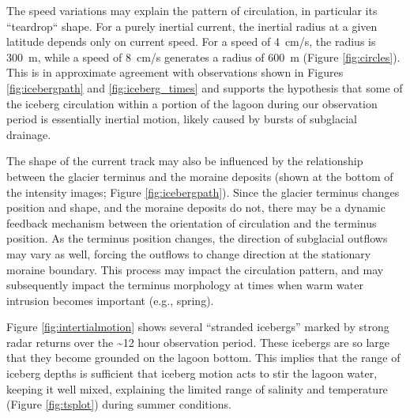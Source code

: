 The speed variations may explain the pattern of circulation, in particular its ``teardrop`` shape. For a purely inertial current, the inertial radius at a given latitude depends only on current speed. For a speed of 4~cm/s, the radius is 300~m, while a speed of 8~cm/s generates a radius of 600~m (Figure \ref{fig:circles}). This is in approximate agreement with observations shown in Figures \ref{fig:icebergpath} and \ref{fig:iceberg_times} and supports the hypothesis that some of the iceberg circulation within a portion of the lagoon during our observation period is essentially inertial motion, likely caused by bursts of subglacial drainage. 

The shape of the current track may also be influenced by the relationship between the glacier terminus and the moraine deposits (shown at the bottom of the intensity images; Figure \ref{fig:icebergpath}). Since the glacier terminus changes position and shape, and the moraine deposits do not, there may be a dynamic feedback mechanism between the orientation of circulation and the terminus position. As the terminus position changes, the direction of subglacial outflows may vary as well, forcing the outflows to change direction at the stationary moraine boundary. This process may impact the circulation pattern, and may subsequently impact the terminus morphology at times when warm water intrusion becomes important (e.g., spring).	

Figure \ref{fig:intertialmotion} shows several ``stranded icebergs'' marked by strong radar returns over the \textasciitilde 12 hour observation period. These icebergs are so large that they become grounded on the lagoon bottom. This implies that the range of iceberg depths is sufficient that iceberg motion acts to stir the lagoon water, keeping it well mixed, explaining the limited range of salinity and temperature (Figure \ref{fig:tsplot}) during summer conditions.

% 






